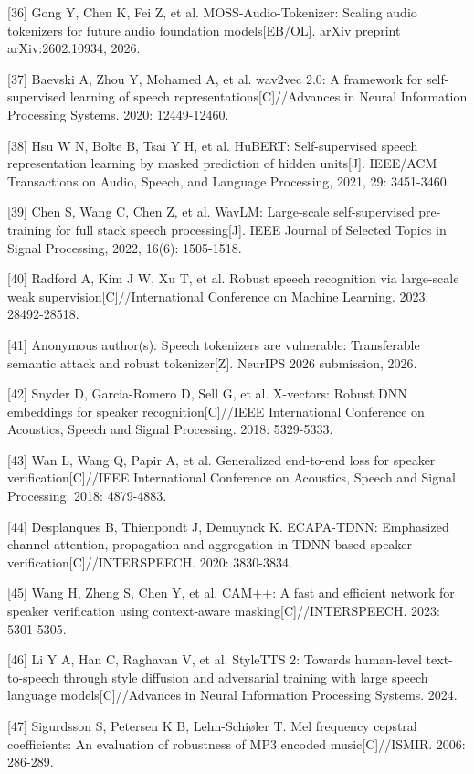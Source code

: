 \begin{referencesblock}
{[}36{]} Gong Y, Chen K, Fei Z, et al. MOSS-Audio-Tokenizer: Scaling
audio tokenizers for future audio foundation models{[}EB/OL{]}. arXiv
preprint arXiv:2602.10934, 2026.

{[}37{]} Baevski A, Zhou Y, Mohamed A, et al. wav2vec 2.0: A framework
for self-supervised learning of speech representations{[}C{]}//Advances
in Neural Information Processing Systems. 2020: 12449-12460.

{[}38{]} Hsu W N, Bolte B, Tsai Y H, et al. HuBERT: Self-supervised
speech representation learning by masked prediction of hidden
units{[}J{]}. IEEE/ACM Transactions on Audio, Speech, and Language
Processing, 2021, 29: 3451-3460.

{[}39{]} Chen S, Wang C, Chen Z, et al. WavLM: Large-scale
self-supervised pre-training for full stack speech processing{[}J{]}.
IEEE Journal of Selected Topics in Signal Processing, 2022, 16(6):
1505-1518.

{[}40{]} Radford A, Kim J W, Xu T, et al. Robust speech recognition via
large-scale weak supervision{[}C{]}//International Conference on Machine
Learning. 2023: 28492-28518.

{[}41{]} Anonymous author(s). Speech tokenizers are vulnerable:
Transferable semantic attack and robust tokenizer{[}Z{]}. NeurIPS 2026
submission, 2026.

{[}42{]} Snyder D, Garcia-Romero D, Sell G, et al. X-vectors: Robust DNN
embeddings for speaker recognition{[}C{]}//IEEE International Conference
on Acoustics, Speech and Signal Processing. 2018: 5329-5333.

{[}43{]} Wan L, Wang Q, Papir A, et al. Generalized end-to-end loss for
speaker verification{[}C{]}//IEEE International Conference on Acoustics,
Speech and Signal Processing. 2018: 4879-4883.

{[}44{]} Desplanques B, Thienpondt J, Demuynck K. ECAPA-TDNN: Emphasized
channel attention, propagation and aggregation in TDNN based speaker
verification{[}C{]}//INTERSPEECH. 2020: 3830-3834.

{[}45{]} Wang H, Zheng S, Chen Y, et al. CAM++: A fast and efficient
network for speaker verification using context-aware
masking{[}C{]}//INTERSPEECH. 2023: 5301-5305.

{[}46{]} Li Y A, Han C, Raghavan V, et al. StyleTTS 2: Towards
human-level text-to-speech through style diffusion and adversarial
training with large speech language models{[}C{]}//Advances in Neural
Information Processing Systems. 2024.

{[}47{]} Sigurdsson S, Petersen K B, Lehn-Schiøler T. Mel frequency
cepstral coefficients: An evaluation of robustness of MP3 encoded
music{[}C{]}//ISMIR. 2006: 286-289.


\end{referencesblock}
